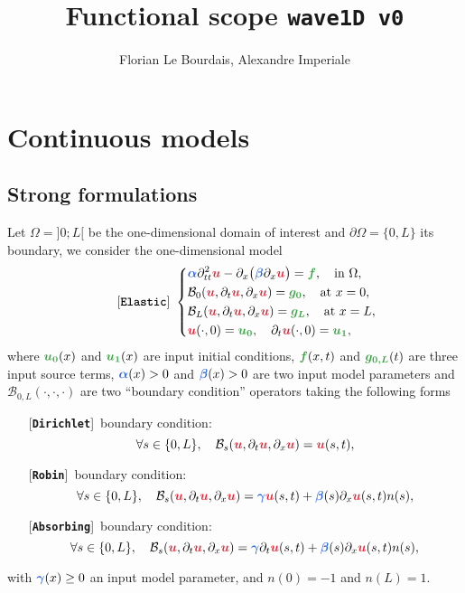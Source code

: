 \documentclass[11pt,a4paper]{article}
\title{Functional scope \texttt{wave1D v0}}
\author[1]{Florian Le Bourdais, Alexandre Imperiale}
\newcommand{\unknown}[1]{\bm{{\color{myred}{#1}}}}
\newcommand{\param}[1]{\bm{{\color{myhyperblue}{#1}}}}
\newcommand{\data}[1]{\bm{{\color{mygreen}{#1}}}}
\newcommand{\keyword}[1]{[\texttt{\textbf{#1}}]\!\,}
\begin{document}
% 

\maketitle

\section{Continuous models}
\subsection{Strong formulations}
Let $\Omega = ]0; L[$ be the one-dimensional domain of interest and $\partial\Omega = \{0, L\}$ its boundary, we consider the one-dimensional model
\begin{equation*}
\quad \quad
\keyword{Elastic}~
\left\lbrace
\begin{aligned}
& \param{\alpha}\partial^2_{tt} \unknown{u} - \partial_x\big( \param{\beta} \partial_x \unknown{u} \big) = \data{f},\quad \text{in }\Omega,\\
& \mathcal{B}_0(\unknown{u}, \partial_t \unknown{u}, \partial_x \unknown{u}) = \data{g_0},\quad \text{at } x = 0,\\
&\mathcal{B}_L(\unknown{u}, \partial_t \unknown{u}, \partial_x \unknown{u}) = \data{g_L},\quad \text{at } x = L,\\
& \unknown{u}(\cdot, 0) = \data{u_0},\quad \partial_t\unknown{u}(\cdot, 0) = \data{u_1},
\end{aligned}
\right.
\end{equation*}
where $\data{u_0}(x)$ and $\data{u_1}(x)$ are input initial conditions, $\data{f}(x, t)$ and $\data{g_{0,L}}(t)$ are three input source terms, $\param{\alpha}(x) > 0$ and $\param{\beta}(x) > 0$ are two input model parameters and $\mathcal{B}_{0, L}(\cdot, \cdot, \cdot)$ are two ``boundary condition'' operators taking the following forms
\begin{itemize}
\item[] \keyword{Dirichlet} boundary condition: 
\begin{equation*}
\forall s \in\{0, L\},\quad \mathcal{B}_s(\unknown{u}, \partial_t \unknown{u}, \partial_x \unknown{u}) = \unknown{u}(s, t),
\end{equation*}
\item[] \keyword{Robin} boundary condition: 
\begin{equation*}
\forall s \in\{0, L\},\quad \mathcal{B}_s(\unknown{u}, \partial_t \unknown{u}, \partial_x \unknown{u}) = \param{\gamma}\unknown{u}(s, t) + \param{\beta}(s)\partial_x \unknown{u}(s, t) n(s),
\end{equation*}
\item[] \keyword{Absorbing} boundary condition:
\begin{equation*}
\forall s \in\{0, L\},\quad \mathcal{B}_s(\unknown{u}, \partial_t \unknown{u}, \partial_x \unknown{u}) = \param{\gamma} \partial_t \unknown{u}(s, t) + \param{\beta}(s)\partial_x \unknown{u}(s, t) n(s),
\end{equation*}
\end{itemize}
with $\param{\gamma}(x) \geq 0$ an input model parameter, and $n(0) = -1$ and $n(L) = 1$.
\end{document}
